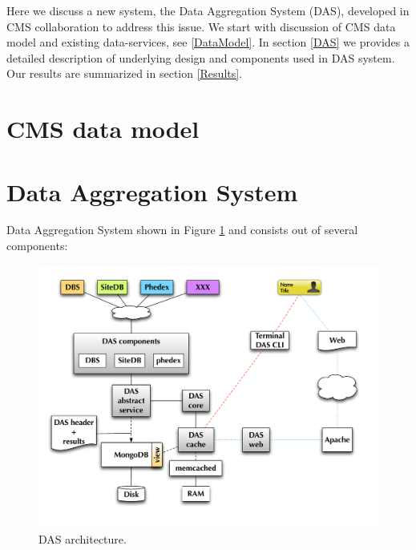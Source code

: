 \documentclass[a4paper]{jpconf}
\begin{document}
Here we discuss a new system, the Data Aggregation System (DAS),
developed in CMS collaboration to address this issue. We start with
discussion of CMS data model and existing data-services, see \ref{DataModel}. 
In section \ref{DAS}
we provides a detailed description of underlying design and components
used in DAS system. Our results are summarized in section \ref{Results}.

\section{CMS data model\label{DataModel}}
\section{Data Aggregation System\label{DAS}}
Data Aggregation System shown in Figure \ref{DAS_arch} and
consists out of several components:
\begin{figure}[htb]
\centering
\includegraphics[width=150mm]{DAS_architecture.pdf}
\caption{
DAS architecture.
}
\label{DAS_arch}
\end{figure}
\end{document}
